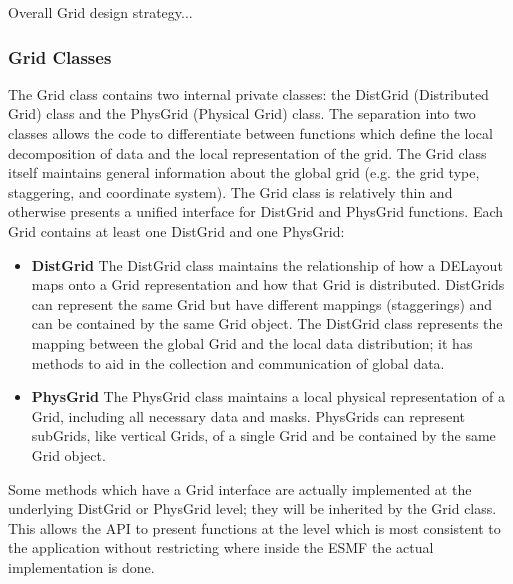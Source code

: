 

Overall Grid design strategy...

\subsubsection{Grid Classes}
The Grid class contains two internal private classes: the DistGrid (Distributed
Grid) class and the PhysGrid (Physical Grid) class.  The separation into two
classes allows the code to differentiate between functions which define the
local decomposition of data and the local representation of the grid.  The Grid
class itself maintains general information about the global grid (e.g. the
grid type, staggering, and coordinate system).  The Grid class is relatively
thin and otherwise presents a unified interface for DistGrid and PhysGrid
functions.  Each Grid contains at least one DistGrid and one PhysGrid:
\begin{itemize}
\item {\bf DistGrid} The DistGrid class maintains the relationship of how
a DELayout maps onto a Grid representation and how that Grid is distributed.
DistGrids can represent the same Grid but have different mappings (staggerings)
and can be contained by the same Grid object. The DistGrid class represents the
mapping between the global Grid and the local data distribution;  it has
methods to aid in the collection and communication of global data.
\item {\bf PhysGrid} The PhysGrid class maintains a local physical
representation of a Grid, including all necessary data and masks.  PhysGrids
can represent subGrids, like vertical Grids, of a single Grid and be
contained by the same Grid object.
\end{itemize}

Some methods which have a Grid interface are actually implemented
at the underlying DistGrid or PhysGrid level; they will be inherited
by the Grid class.  This allows the API to present functions at the 
level which is most consistent to the application without restricting
where inside the ESMF the actual implementation is done.


